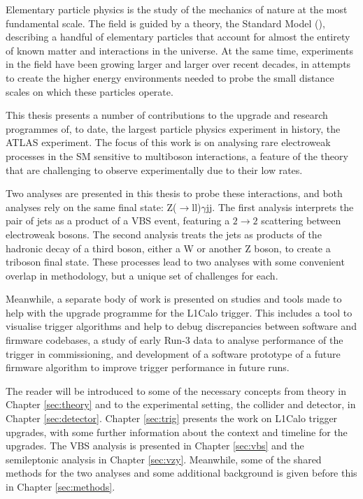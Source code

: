 Elementary particle physics is the study of the mechanics of nature at the most
fundamental scale. The field is guided by a theory, the Standard Model
(), describing a handful of elementary particles that account for almost
the entirety of known matter and interactions in the universe. At the same time,
experiments in the field have been growing larger and larger over recent
decades, in attempts to create the higher energy environments needed to probe
the small distance scales on which these particles operate.

This thesis presents a number of contributions to the upgrade and research
programmes of, to date, the largest particle physics experiment in history, the
\ac{ATLAS} experiment. The focus of this work is on analysing rare electroweak
processes in the \ac{SM} sensitive to multiboson interactions, a 
feature of the theory that are challenging to observe experimentally due to
their low rates.

Two analyses are presented in this thesis to probe these interactions, and both
analyses rely on the same final state: Z($\to$ll)$\gamma$jj. The first analysis
interprets the pair of jets as a product of a \ac{VBS} event, featuring a
$2\to2$ scattering between electroweak bosons. The second analysis treats the
jets as products of the hadronic decay of a third boson, either a W or another Z
boson, to create a triboson final state. These processes lead to two analyses
with some convenient overlap in methodology, but a unique set of challenges for
each.

Meanwhile, a separate body of work is presented on studies and tools made to
help with the upgrade programme for the \ac{L1Calo} trigger. This includes a
tool to visualise trigger algorithms and help to debug discrepancies between
software and firmware codebases, a study of early Run-3 data to analyse
performance of the trigger in commissioning, and development of a software
prototype of a future firmware algorithm to improve trigger performance in
future runs.

The reader will be introduced to some of the necessary concepts from theory in
Chapter \ref{sec:theory} and to the experimental setting, the collider and
detector, in Chapter \ref{sec:detector}. Chapter \ref{sec:trig} presents the
work on \ac{L1Calo} trigger upgrades, with some further information about the
context and timeline for the upgrades. The \ac{VBS} \Zy analysis is presented in
Chapter \ref{sec:vbs} and the semileptonic \VZy analysis in Chapter
\ref{sec:vzy}.  Meanwhile, some of the shared methods for the two analyses and
some additional background is given before this in Chapter \ref{sec:methods}.
